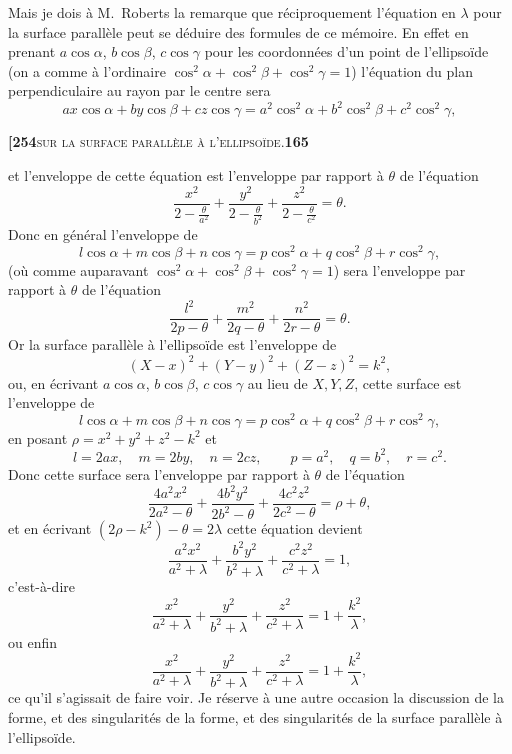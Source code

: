 \documentclass[11pt]{article}
\begin{document}
Mais je dois à M.~Roberts la remarque que réciproquement l'équation en $\lambda$ pour la surface parallèle peut se déduire des formules de ce mémoire. En effet en prenant $a\cos\alpha$, $b\cos\beta$, $c\cos\gamma$ pour les coordonnées d'un point de l'ellipsoïde (on a comme à l'ordinaire $\cos^2\alpha + \cos^2\beta + \cos^2\gamma = 1$) l'équation du plan perpendiculaire au rayon par le centre sera
\[
ax\cos\alpha + by\cos\beta + cz\cos\gamma = a^2\cos^2\alpha + b^2\cos^2\beta + c^2\cos^2\gamma,
\]

\newpage

\noindent\textbf{[254}\hfill\textsc{sur la surface parallèle à l'ellipsoïde.}\hfill\textbf{165}

\medskip

\noindent et l'enveloppe de cette équation est l'enveloppe par rapport à $\theta$ de l'équation
\[
\frac{x^2}{2 - \tfrac{\theta}{a^2}} + \frac{y^2}{2 - \tfrac{\theta}{b^2}} + \frac{z^2}{2 - \tfrac{\theta}{c^2}} = \theta.
\]
Donc en général l'enveloppe de
\[
l\cos\alpha + m\cos\beta + n\cos\gamma = p\cos^2\alpha + q\cos^2\beta + r\cos^2\gamma,
\]
(où comme auparavant $\cos^2\alpha + \cos^2\beta + \cos^2\gamma = 1$) sera l'enveloppe par rapport à $\theta$ de l'équation
\[
\frac{l^2}{2p - \theta} + \frac{m^2}{2q - \theta} + \frac{n^2}{2r - \theta} = \theta.
\]
Or la surface parallèle à l'ellipsoïde est l'enveloppe de
\[
(X - x)^2 + (Y - y)^2 + (Z - z)^2 = k^2,
\]
ou, en écrivant $a\cos\alpha$, $b\cos\beta$, $c\cos\gamma$ au lieu de $X, Y, Z$, cette surface est l'enveloppe de
\[
l\cos\alpha + m\cos\beta + n\cos\gamma = p\cos^2\alpha + q\cos^2\beta + r\cos^2\gamma,
\]
en posant $\rho = x^2 + y^2 + z^2 - k^2$ et
\[
l = 2ax,\quad m = 2by,\quad n = 2cz,\qquad p = a^2,\quad q = b^2,\quad r = c^2.
\]
Donc cette surface sera l'enveloppe par rapport à $\theta$ de l'équation
\[
\frac{4a^2x^2}{2a^2 - \theta} + \frac{4b^2y^2}{2b^2 - \theta} + \frac{4c^2z^2}{2c^2 - \theta} = \rho + \theta,
\]
et en écrivant $(2\rho - k^2) - \theta = 2\lambda$ cette équation devient
\[
\frac{a^2x^2}{a^2 + \lambda} + \frac{b^2y^2}{b^2 + \lambda} + \frac{c^2z^2}{c^2 + \lambda} = 1,
\]
c'est-à-dire
\[
\frac{x^2}{a^2 + \lambda} + \frac{y^2}{b^2 + \lambda} + \frac{z^2}{c^2 + \lambda} = 1 + \frac{k^2}{\lambda},
\]
ou enfin
\[
\frac{x^2}{a^2 + \lambda} + \frac{y^2}{b^2 + \lambda} + \frac{z^2}{c^2 + \lambda} = 1 + \frac{k^2}{\lambda},
\]
ce qu'il s'agissait de faire voir. Je réserve à une autre occasion la discussion de la forme, et des singularités de la forme, et des singularités de la surface parallèle à l'ellipsoïde.
\end{document}
